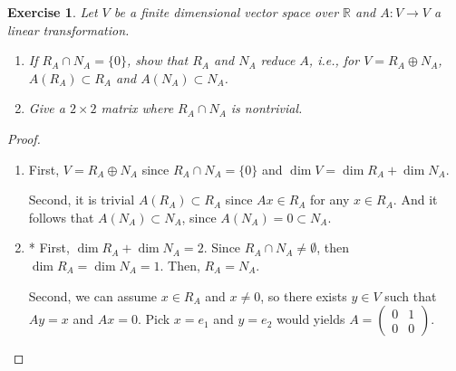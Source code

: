 \documentclass[10pt]{book}
\newtheorem{exercise}{Exercise}[section]
\theoremstyle{definition}
\numberwithin{equation}{chapter}
\begin{document}
\begin{exercise}
Let $V$ be a finite dimensional vector space over $\mathbb{R}$ and $A: V \to V$ a linear transformation.
\begin{enumerate}[label=(\alph*)]
    \item If $R_A \cap N_A = \{0\}$, show that $R_A$ and $N_A$ reduce $A$, i.e., for $V = R_A \oplus N_A$, $A(R_A) \subset R_A$ and $A(N_A) \subset N_A$.
    
    \item Give a $2 \times 2$ matrix where $R_A \cap N_A$ is nontrivial.
\end{enumerate}
\end{exercise}
\begin{proof}
~\begin{enumerate}[label=(\alph*)]
    \item First, $V = R_A \oplus N_A$ since $R_A \cap N_A = \{0\}$ and $\dim V = \dim R_A + \dim N_A$.
    
    Second, it is trivial $A(R_A) \subset R_A$ since $Ax \in R_A$ for any $x \in R_A$. And it follows that $A(N_A) \subset N_A$, since $A(N_A) = 0 \subset N_A$.
    
    \item* First, $\dim R_A + \dim N_A = 2$. Since $R_A \cap N_A \neq \emptyset$, then $\dim R_A = \dim N_A = 1$. Then, $R_A = N_A$.
    
    Second, we can assume $x \in R_A$ and $x \neq 0$, so there exists $y \in V$ such that $Ay = x$ and $Ax = 0$. Pick $x = e_1$ and $y = e_2$ would yields $A = \begin{pmatrix} 0 & 1 \\ 0 & 0 \end{pmatrix}$.
\end{enumerate}
\end{proof}

\medskip
\end{document}

